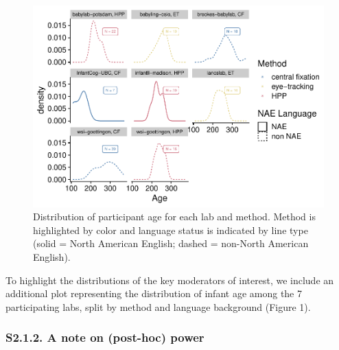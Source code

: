 \documentclass[
  english,
  man, donotrepeattitle,floatsintext]{apa6}
\begin{document}
\begin{figure}

{\centering \includegraphics{MB1T_supplement_files/figure-latex/unnamed-chunk-3-1} 

}

\caption{Distribution of participant age for each lab and method. Method is highlighted by color and  language status is indicated by line type (solid = North American English; dashed = non-North American English).}\label{fig:unnamed-chunk-3}
\end{figure}

To highlight the distributions of the key moderators of interest, we include an additional plot representing the distribution of infant age among the 7 participating labs, split by method and language background (Figure 1).

\hypertarget{s2.1.2.-a-note-on-post-hoc-power}{%
\subsubsection{S2.1.2. A note on (post-hoc) power}\label{s2.1.2.-a-note-on-post-hoc-power}}
\end{document}
